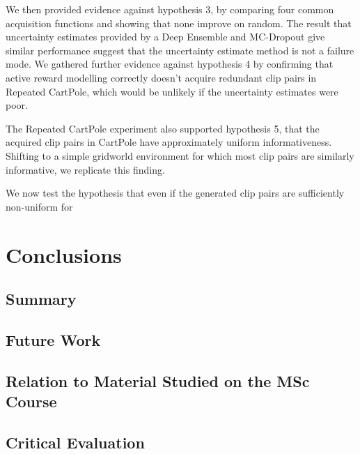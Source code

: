 \documentclass[11pt, a4paper, bibliography=totoc]{report}
\begin{document}
We then provided evidence against hypothesis 3, by comparing four common acquisition functions and showing that none improve on random. The result that uncertainty estimates provided by a Deep Ensemble and MC-Dropout give similar performance suggest that the uncertainty estimate method is not a failure mode. We gathered further evidence against hypothesis 4 by confirming that active reward modelling correctly doesn't acquire redundant clip pairs in Repeated CartPole, which would be unlikely if the uncertainty estimates were poor.

The Repeated CartPole experiment also supported hypothesis 5, that the acquired clip pairs in CartPole have approximately uniform informativeness. Shifting to a simple gridworld environment for which most clip pairs are similarly informative, we replicate this finding.

We now test the hypothesis that even if the generated clip pairs are sufficiently non-uniform for 

\chapter{Conclusions}
\section{Summary}
\section{Future Work}
\section{Relation to Material Studied on the MSc Course}
\section{Critical Evaluation}
\end{document}
